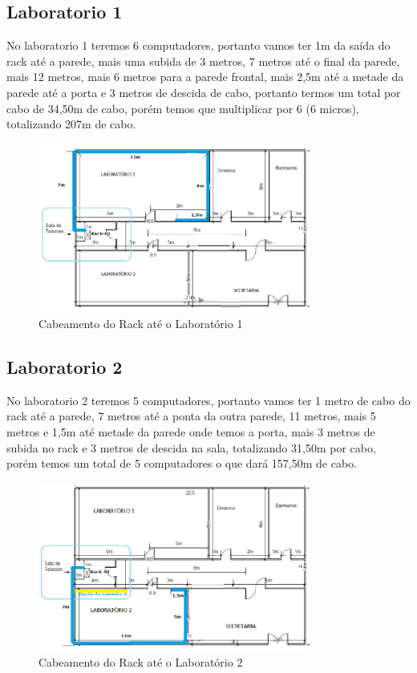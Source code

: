 \documentclass[	DIV=calc,%
							paper=a4,%
							fontsize=12pt,%
							onecolumn]{scrartcl}	 					%
\begin{document}
\subsection{Laboratorio 1}

No laboratorio 1 teremos 6 computadores, portanto vamos ter 1m da saída do rack até a parede, mais uma subida de 3 metros, 7 metros até o final da parede, mais 12 metros, mais 6 metros para a parede frontal, mais 2,5m até a metade da parede até a porta e 3 metros de descida de cabo, portanto termos um total por cabo de 34,50m de cabo, porém temos que multiplicar por 6 (6 micros), totalizando 207m de cabo.
\begin{figure}[H]
	\centering
	\includegraphics[width=0.8\textwidth]{fig8}
	\caption{Cabeamento do Rack até o Laboratório 1}
	\label{fig8}
\end{figure}

\subsection{Laboratorio 2}

No laboratorio 2 teremos 5 computadores, portanto vamos ter 1 metro de cabo do rack até a parede, 7 metros até a ponta da outra parede, 11 metros, mais 5 metros e 1,5m até metade da parede onde temos a porta, mais 3 metros de subida no rack e 3 metros de descida na sala, totalizando 31,50m por cabo, porém temos um total de 5 computadores o que dará 157,50m de cabo.
\begin{figure}[H]
	\centering
	\includegraphics[width=0.8\textwidth]{fig9}
	\caption{Cabeamento do Rack até o Laboratório 2}
	\label{fig9}
\end{figure}
\end{document}
